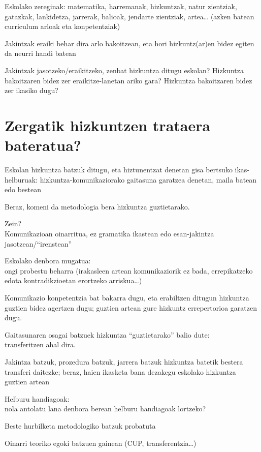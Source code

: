 \documentclass[
]{book}
\begin{document}
Eskolako zereginak: matematika, harremanak, hizkuntzak, natur zientziak, gatazkak, lankidetza, jarrerak, balioak, jendarte zientziak, artea\ldots{} (azken batean curriculum arloak eta konpetentziak)

Jakintzak eraiki behar dira arlo bakoitzean, eta hori hizkuntz(ar)en bidez egiten da neurri handi batean

Jakintzak jasotzeko/eraikitzeko, zenbat hizkuntza ditugu eskolan? Hizkuntza bakoitzaren bidez zer eraikitze-lanetan ariko gara? Hizkuntza bakoitzaren bidez zer ikasiko dugu?

\hypertarget{zergatik-hizkuntzen-trataera-bateratua}{%
\section{Zergatik hizkuntzen trataera bateratua?}\label{zergatik-hizkuntzen-trataera-bateratua}}

Eskolan hizkuntza batzuk ditugu, eta hiztunentzat denetan gisa bertsuko ikas-helburuak: hizkuntza-komunikaziorako gaitasuna garatzea denetan, maila batean edo bestean

Beraz, komeni da metodologia bera hizkuntza guztietarako.

Zein?\\
Komunikazioan oinarritua, ez gramatika ikastean edo esan-jakintza jasotzean/``irenstean''

Eskolako denbora mugatua:\\
ongi probestu beharra (irakasleen artean komunikaziorik ez bada, errepikatzeko edota kontradikzioetan erortzeko arriskua\ldots)

Komunikazio konpetentzia bat bakarra dugu, eta erabiltzen ditugun hizkuntza guztien bidez agertzen dugu; guztien artean gure hizkuntz errepertorioa garatzen dugu.

Gaitasunaren osagai batzuek hizkuntza ``guztietarako'' balio dute:\\
transferitzen ahal dira.

Jakintza batzuk, prozedura batzuk, jarrera batzuk hizkuntza batetik bestera transferi daitezke; beraz, haien ikasketa bana dezakegu eskolako hizkuntza guztien artean

Helburu handiagoak:\\
nola antolatu lana denbora berean helburu handiagoak lortzeko?

Beste hurbilketa metodologiko batzuk probatuta

Oinarri teoriko egoki batzuen gainean (CUP, transferentzia\ldots)
\end{document}
